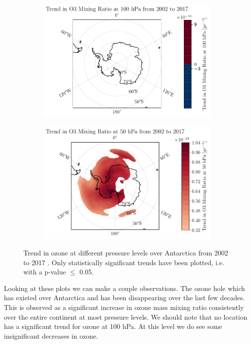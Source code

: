 \documentclass[../main.tex]{subfiles}
\begin{document}
\begin{figure}[hbt!]
\begin{subfigure}[b]{0.5\textwidth}
    \end{subfigure}
    \begin{subfigure}[b]{0.5\textwidth}
    \includegraphics[width=\textwidth]{images/2021w5/chapter7/hres/trend_spatial_o3_100}
    \end{subfigure}
    \begin{subfigure}[b]{0.5\textwidth}
    \includegraphics[width=\textwidth]{images/2021w5/chapter7/hres/trend_spatial_o3_50}
    \end{subfigure}
    \caption{Trend in ozone at different pressure levels over Antarctica from 2002 to 2017 . Only statistically significant trends have been plotted, i.e. with a p-value $\leq$ 0.05.}
    \label{fig:trend_o3_02_17}
\end{figure}

Looking at these plots we can make a couple observations. The ozone hole which has existed over Antarctica and has been disappearing over the last few decades. This is observed as a significant increase in ozone mass mixing ratio consistently over the entire continent at most pressure levels. We should note that no location has a significant trend for ozone at 100 hPa. At this level we do see some insignificant decreases in ozone.
\end{document}
